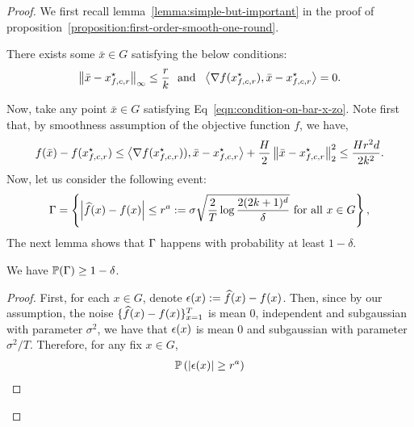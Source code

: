 \begin{proof}
We first recall lemma~\ref{lemma:simple-but-important} in the proof of 
proposition~\ref{proposition:first-order-smooth-one-round}.
\begin{lemma}
There exists some $\bar{x} \in G$ satisfying the below conditions: 
\begin{equation}
\label{eqn:condition-on-bar-x-zo}
\norm{\bar{x} - x_{f, c, r}\opt}_\infty \leq \frac{r}{k}
	~~\text{and}~~
		\left<\grad f(x_{f, c, r}\opt), \bar{x} - x_{f, c, r}\opt\right> = 0.
\end{equation}
\end{lemma}\noindent
Now, take any point $\bar{x}\in G$ satisfying Eq~\eqref{eqn:condition-on-bar-x-zo}.
Note first that, by smoothness assumption of the objective function $f$, we have, 
\begin{equation*}
f(\bar{x}) - f(x_{f, c, r}\opt) \leq \left<\grad f(x_{f, c, r}\opt)), \bar{x} - x_{f, c, r}\opt\right>
	+ \frac{H}{2} \norm{\bar{x} - x_{f, c, r}\opt}_2^2 \leq \frac{Hr^2 d}{2k^2}.
\end{equation*}
Now, let us consider the following event: 
\begin{equation*}
\event = \left\{\left|\what{f}(x) - f(x)\right| \leq r^a \defeq 
	\sigma \sqrt{\frac{2}{T}\log \frac{2(2k+1)^d}{\delta}}
	~\text{for all}~x \in G\right\}, 
\end{equation*}
The next lemma shows that $\event$ happens with probability at least $1-\delta$. 
\begin{lemma}
We have $\P(\Gamma) \geq 1-\delta$. 
\end{lemma}
\begin{proof}
First, for each $x \in G$, denote $\noise(x) \defeq \what{f}(x) - f(x)$.  Then, since 
by our assumption, the noise $\{\what{f}(x) - f(x)\}_{x=1}^{T}$ is mean $0$, independent 
and subgaussian with parameter $\sigma^2$, we have that $\noise(x)$ is mean $0$ 
and subgaussian with parameter $\sigma^2/T$. Therefore, for any fix $x\in G$, 
\begin{align*}
\P\left(|\noise(x)| \geq r^a \right) 

\end{align*}
\end{proof}
\end{proof}
